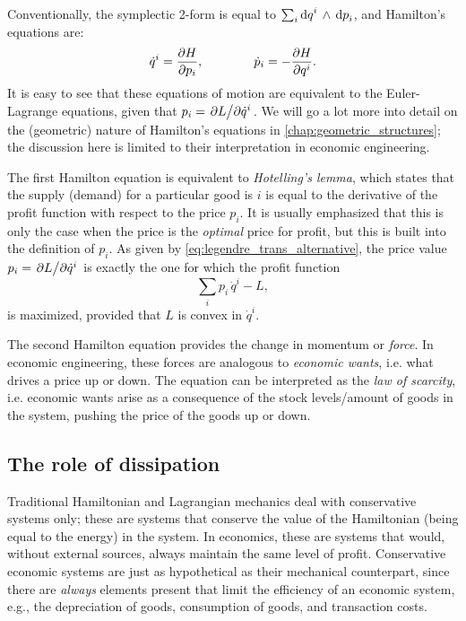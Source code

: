Conventionally, the symplectic 2-form is equal to $\sum_i  \dd{q}^i\,\wedge\,\dd{p}_i $, and Hamilton's equations are:
\begin{equation}
    \dot{q}^i = \pdv{H}{p_i}, \qquad \qquad \dot{p}_i = -\pdv{H}{q^i}.
    \label{eq:legendre_trans_alternative}
\end{equation}
It is easy to see that these equations of motion are equivalent to the Euler-Lagrange equations, given that \(p_i = \pdv*{L}{\dot{q}^i}\). We will go a lot more into detail on the (geometric) nature of Hamilton's equations in \cref{chap:geometric_structures}; the discussion here is limited to their interpretation in economic engineering.

The first Hamilton equation is equivalent to \emph{Hotelling's lemma}, which states that the supply (demand) for a particular good is \(i\) is equal to the derivative of the profit function with respect to the price \(p_i\). It is usually emphasized that this is only the case when the price is the \emph{optimal} price for profit, but this is built into the definition of \(p_i\). As given by \cref{eq:legendre_trans_alternative}, the price value \(p_i = \pdv*{L}{\dot{q}^i}\) is exactly the one for which the profit function
\begin{equation}
     \sum_i p_i\,\dot{q}^i - L,
\end{equation}
is maximized, provided that \(L\) is convex in \(\dot{q}^i\). 

The second Hamilton equation provides the change in momentum or \emph{force}. In economic engineering, these forces are analogous to \emph{economic wants}, i.e. what drives a price up or down. The equation can be interpreted as the \emph{law of scarcity}, i.e. economic wants arise as a consequence of the stock levels/amount of goods in the system, pushing the price of the goods up or down.

\subsection{The role of dissipation} 
Traditional Hamiltonian and Lagrangian mechanics deal with conservative systems only; these are systems that conserve the value of the Hamiltonian (being equal to the energy) in the system. In economics, these are systems that would, without external sources, always maintain the same level of profit. Conservative economic systems are just as hypothetical as their mechanical counterpart, since there are \emph{always} elements present that limit the efficiency of an economic system, e.g., the depreciation of goods, consumption of goods, and transaction costs. 

